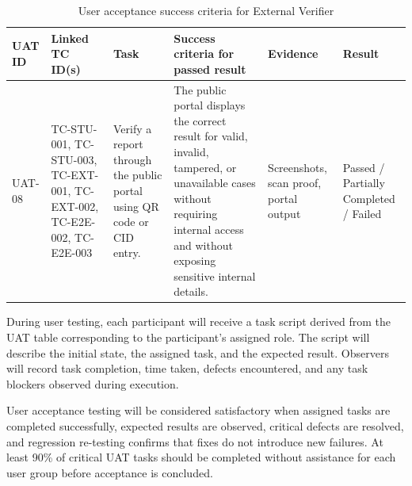 \begin{table}[H]
  \centering
  \smalltable
  \scriptsize
  {%
  \setlength{\tabcolsep}{3pt}
  \renewcommand{\arraystretch}{1.18}
  \begin{tabular}{|>{\raggedright\arraybackslash}p{}|
                  >{\raggedright\arraybackslash}p{}|
                  >{\raggedright\arraybackslash}p{}|
                  >{\raggedright\arraybackslash}p{}|
                  >{\raggedright\arraybackslash}p{}|
                  >{\centering\arraybackslash}p{}|}
    \hline
    \textbf{UAT ID} &
    \textbf{Linked TC ID(s)} &
    \textbf{Task} &
    \textbf{Success criteria for passed result} &
    \textbf{Evidence} &
    \textbf{Result} \\
    \hline\hline

    UAT-08 &
    TC-STU-001, TC-STU-003, TC-EXT-001, TC-EXT-002, TC-E2E-002, TC-E2E-003 &
    Verify a report through the public portal using QR code or CID entry. &
    The public portal displays the correct result for valid, invalid,
    tampered, or unavailable cases without requiring internal access and
    without exposing sensitive internal details. &
    Screenshots, scan proof, portal output &
    Passed / Partially Completed / Failed \\
    \hline

  \end{tabular}
  }%
  \captionsetup{type=table}
  \caption{User acceptance success criteria for External Verifier}
  \label{tab:uat-success-verifier}
\end{table}

During user testing, each participant will receive a task script derived from
the UAT table corresponding to the participant's assigned role. The script
will describe the initial state, the assigned task, and the expected result.
Observers will record task completion, time taken, defects encountered, and
any task blockers observed during execution.

User acceptance testing will be considered satisfactory when assigned tasks
are completed successfully, expected results are observed, critical defects
are resolved, and regression re-testing confirms that fixes do not introduce
new failures. At least 90\% of critical UAT tasks should be completed
without assistance for each user group before acceptance is concluded.

